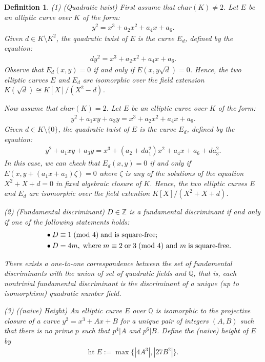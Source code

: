 \documentclass[12pt,reqno]{amsart}
\newtheorem{definition}[thm]{Definition}
\numberwithin{equation}{section}
\def\Z{{\mathbb Z}}
\def\Q{{\mathbb Q}}
\begin{document}
\begin{definition}
{\rm
(1) (Quadratic twist) First assume that $char(K) \neq 2$. Let $E$ be an alliptic curve over $K$ of the form:
\begin{align*}
y^2 = x^3 + a_2x^2 + a_4x + a_6.
\end{align*}
Given $d \in K\setminus K^2$, the quadratic twist of $E$ is the curve $E_d$, defined by the equation:
\begin{align*}
dy^2 = x^3 + a_2x^2 + a_4x + a_6.
\end{align*}
Observe that $E_d(x,y) = 0$ if and only if $E(x,y\sqrt{d}) = 0$. Hence, the two elliptic curves $E$ and $E_d$ are isomorphic over the field extension $K(\sqrt{d}) \cong K[X]/(X^2-d)$.

Now assume that $char(K) = 2$. Let $E$ be an elliptic curve over $K$ of the form:
\begin{align*}
y^2 + a_1xy + a_3y = x^3 + a_2x^2 + a_4x + a_6.
\end{align*}
Given $d \in K\setminus \{0\}$, the quadratic twist of $E$ is the curve $E_d$, defined by the equation:
\begin{align*}
y^2 + a_1xy + a_3y = x^3 + (a_2 + da_1^2)x^2 + a_4x + a_6 + da_3^2.
\end{align*}
In this case, we can check that $E_d(x,y) = 0$ if and only if $E(x, y+(a_1x+a_3)\zeta) =0$ where $\zeta$ is any of the solutions of the equation $X^2+X+d=0$ in fixed algebraic closure of $K$. Hence, the two elliptic curves $E$ and $E_d$ are isomorphic over the field extention $K[X]/(X^2+X+d)$.

\smallskip

(2) (Fundamental discriminant) $D \in \Z$ is a fundamental discriminant if and only if one of the following statements holds:
\begin{align*}
&\indent \bullet D \equiv 1 \; \text{(mod 4)} \; \text{and is square-free}; \\
&\indent \bullet D = 4m, \; \text{where} \; m \equiv 2 \; \text{or} \; 3 \; \text{(mod 4) and } m \; \text{is square-free}.
\end{align*}

There exists a one-to-one correspondence between the set of fundamental discriminants with the union of set of quadratic fields and $\Q$, that is, each nontrivial fundamental discriminant is the discriminant of a unique (up to isomorphism) quadratic number field.

\smallskip

(3) ((naive) Height) An elliptic curve $E$ over $\Q$ is isomorphic to the projective closure of a curve $y^2 = x^3 + Ax + B$ for a unique pair of integers $(A,B)$ such that there is no prime $p$ such that $p^4 | A$ and $p^6 | B$. Define the (naive) height of $E$ by
\begin{align*}
\text{ht} \; E:= \max \{|4A^3|, |27B^2|\}.
\end{align*}

}
\end{definition}
\end{document}
